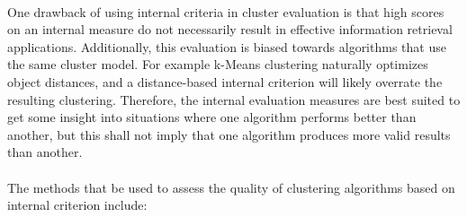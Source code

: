 \documentclass[10pt]{article}\usepackage[]{graphicx}\usepackage[]{color}
\begin{document}
\paragraph{}
One drawback of using internal criteria in cluster evaluation is that high scores on an internal measure do not necessarily result in effective information retrieval applications.  Additionally, this evaluation is biased towards algorithms that use the same cluster model. For example k-Means clustering naturally optimizes object distances, and a distance-based internal criterion will likely overrate the resulting clustering. Therefore, the internal evaluation measures are best suited to get some insight into situations where one algorithm performs better than another, but this shall not imply that one algorithm produces more valid results than another.
\paragraph{}
The methods that be used to assess the quality of clustering algorithms based on internal criterion include:
\end{document}

